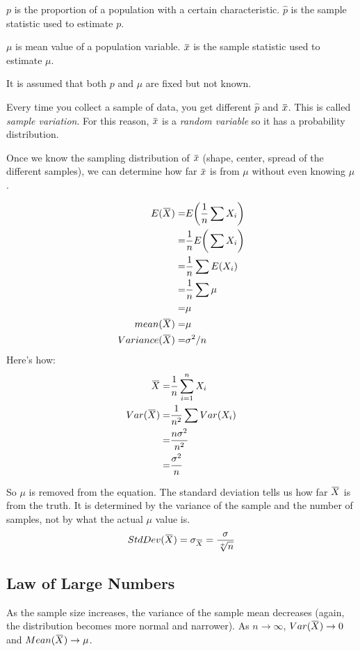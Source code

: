 \documentclass[11pt, oneside]{article}   	%
\newcommand{\overbar}[1]{\mkern 1.5mu\overline{\mkern-1.5mu#1\mkern-1.5mu}\mkern 1.5mu}
\begin{document}
$p$ is the proportion of a population with a certain characteristic. $\hat{p}$ is the sample statistic used to estimate $p$.

$\mu$ is mean value of a population variable. $\overbar{x}$ is the sample statistic used to estimate $\mu$.

It is assumed that both $p$ and $\mu$ are fixed but not known.

Every time you collect a sample of data, you get different $\hat{p}$ and $\overbar{x}$. This is called \textit{sample variation}. For this reason, $\overbar{x}$ is a \textit{random variable} so it has a probability distribution. 

Once we know the sampling distribution of $\overbar{x}$ (shape, center, spread of the different samples), we can determine how far $\overbar{x}$ is from $\mu$ without even knowing $\mu$.

\begin{align*}
E(\overbar{X}) =& E\bigg(\frac{1}{n} \sum X_i  \bigg) \\
 =& \frac{1}{n}E\bigg(\sum X_i \bigg) \\
 =& \frac{1}{n}\sum E(X_i)\\
 =& \frac{1}{n}\sum \mu \\
 =& \mu \\
mean(\overbar{X}) =& \mu \\
Variance(\overbar{X}) =& \sigma^2 / n \\
\end{align*}
Here's how:
\begin{align*}
\overbar{X} = & \frac{1}{n}\sum \limits_{i=1}^{n} X_i \\
Var(\overbar{X}) =& \frac{1}{n^2} \sum Var(X_i) \\
	=& \frac{n\sigma^2}{n^2} \\
	=& \frac{\sigma^2}{n}
\end{align*}

So $\mu$ is removed from the equation.  The standard deviation tells us how far $\overbar{X}$ is from the truth. It is determined by the variance of the sample and the number of samples, not by what the actual $\mu$ value is.
\[
StdDev(\overbar{X}) = \sigma_{\overbar{X}} = \frac{\sigma}{\sqrt[+]{n}}
\]

\subsection{Law of Large Numbers}

As the sample size increases, the variance of the sample mean decreases (again, the distribution becomes more normal and narrower). As $n \rightarrow \infty$, $Var(\overbar{X}) \rightarrow 0$ and $Mean(\overbar{X}) \rightarrow \mu$. 
\end{document}
